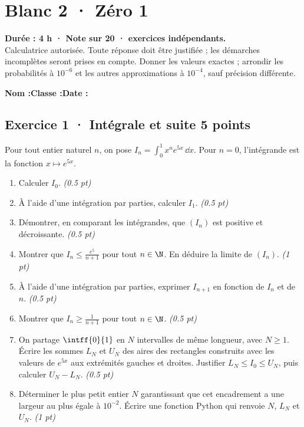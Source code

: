 \mxnewpage{}\label{sujet:8-1}

\section*{Blanc 2 · Zéro 1}


\textbf{Durée : 4 h · Note sur 20 ·  exercices indépendants.}\\Calculatrice autorisée. Toute réponse doit être justifiée ; les démarches incomplètes seront prises en compte. Donner les valeurs exactes ; arrondir les probabilités à $10^{-6}$ et les autres approximations à $10^{-4}$, sauf précision différente.

\smallskip\textbf{Nom :}\enspace\dotfill\quad\textbf{Classe :}\enspace\dotfill\quad\textbf{Date :}\enspace\dotfill

\subsection*{Exercice 1 · Intégrale et suite \hfill 5 points}Pour tout entier naturel $n$, on pose $I_n=\displaystyle\int_0^1x^ne^{5x}\,\dd x$. Pour $n=0$, l'intégrande est la fonction $x\mapsto e^{5x}$.

\begin{enumerate}

\item Calculer $I_0$. \hfill\textit{(\num{0,5} pt)}

\item À l'aide d'une intégration par parties, calculer $I_1$. \hfill\textit{(\num{0,5} pt)}

\item Démontrer, en comparant les intégrandes, que $(I_n)$ est positive et décroissante. \hfill\textit{(\num{0,5} pt)}

\item Montrer que $I_n\le\frac{e^{5}}{n+1}$ pour tout $n\in\N$. En déduire la limite de $(I_n)$. \hfill\textit{(1 pt)}

\item À l'aide d'une intégration par parties, exprimer $I_{n+1}$ en fonction de $I_n$ et de $n$. \hfill\textit{(\num{0,5} pt)}

\item Montrer que $I_n\ge\frac1{n+1}$ pour tout $n\in\N$. \hfill\textit{(\num{0,5} pt)}

\item On partage $\intff{0}{1}$ en $N$ intervalles de même longueur, avec $N\ge1$. Écrire les sommes $L_N$ et $U_N$ des aires des rectangles construits avec les valeurs de $e^{5x}$ aux extrémités gauches et droites. Justifier $L_N\le I_0\le U_N$, puis calculer $U_N-L_N$. \hfill\textit{(\num{0,5} pt)}

\item Déterminer le plus petit entier $N$ garantissant que cet encadrement a une largeur au plus égale à $10^{-2}$. Écrire une fonction Python qui renvoie $N$, $L_N$ et $U_N$. \hfill\textit{(1 pt)}

\end{enumerate}

